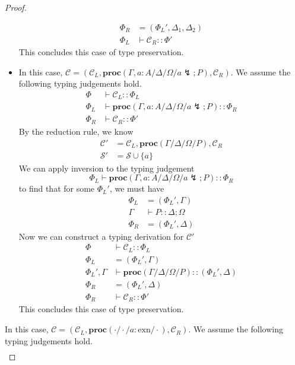 \documentclass[12pt, openany]{memoir}
\newcommand*{\cancel}[1]{#1 \lightning}
\newcommand*{\procObj}[4]{\textbf{proc}(#1/#2/#3/#4)}
\newcommand*{\config}[0]{\mathcal{C}}
\newcommand*{\cancelSet}[0]{\mathcal{S}}
\begin{document}
\begin{proof}
\begin{itemize}
\begin{align*}
      \Phi_R &= (\Phi_L', \Delta_1, \Delta_2) \\
      \Phi_L & \vdash \config_R :: \Phi'
    \end{align*}
    This concludes this case of type preservation.
  \item [\stepref{cancelL}{cancel-l}] In this case, $\config = (\config_L, \procObj{\Gamma, a : A}{\Delta}{\Omega}{\cancel{a}; P}, \config_R)$.
    We assume the following typing judgements hold.
    \begin{align*}
      \Phi & \vdash \config_L :: \Phi_L \\
      \Phi_L & \vdash \procObj{\Gamma, a : A}{\Delta}{\Omega}{\cancel{a}; P} :: \Phi_R \\
      \Phi_R & \vdash \config_R :: \Phi'
    \end{align*}
    By the reduction rule, we know
    \begin{align*}
      \config' &= \config_L, \procObj{\Gamma}{\Delta}{\Omega}{P}, \config_R \\
      \cancelSet' &= \cancelSet \cup \{a\}
    \end{align*}
    We can apply inversion to the typing judgement
    \[
      \Phi_L \vdash \procObj{\Gamma, a : A}{\Delta}{\Omega}{\cancel{a}; P} :: \Phi_R
    \]
    to find that for some $\Phi_L'$, we must have
    \begin{align*}
      \Phi_L & = (\Phi_L', \Gamma) \\
      \Gamma & \vdash P :: \Delta; \Omega \\
      \Phi_R & = (\Phi_L', \Delta)
    \end{align*}
    Now we can construct a typing derivation for $\config'$
    \begin{align*}
      \Phi & \vdash \config_L :: \Phi_L \\
      \Phi_L & = (\Phi_L', \Gamma) \\
      \Phi_L', \Gamma & \vdash \procObj{\Gamma}{\Delta}{\Omega}{P} :: (\Phi_L', \Delta) \\
      \Phi_R & = (\Phi_L', \Delta) \\
      \Phi_R & \vdash \config_R :: \Phi'
    \end{align*}
    This concludes this case of type preservation.
  \end{itemize}
\item [\stepref{silence}{silent}] In this case, $\config = (\config_L, \procObj{\cdot}{\cdot}{a : \text{exn}}{\cdot}, \config_R)$.
  We assume the following typing judgements hold.
  \begin{align*}

\end{align*}
\end{proof}
\end{document}
